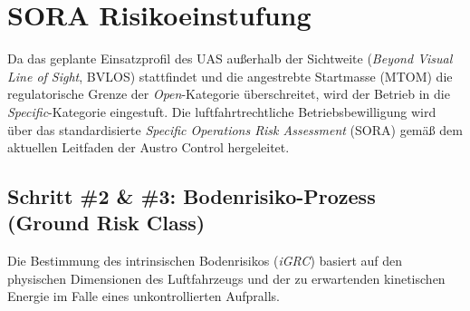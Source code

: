 \section{SORA Risikoeinstufung}
\label{sec:sora_risikoeinstufung}

Da das geplante Einsatzprofil des UAS außerhalb der Sichtweite (\textit{Beyond Visual Line of Sight}, BVLOS) stattfindet und die angestrebte Startmasse (MTOM) die regulatorische Grenze der 
\textit{Open}-Kategorie überschreitet, wird der Betrieb in die \textit{Specific}-Kategorie eingestuft. Die luftfahrtrechtliche Betriebsbewilligung wird über das standardisierte 
\textit{Specific Operations Risk Assessment} (SORA) gemäß dem aktuellen Leitfaden der Austro Control \cite{austrocontrol_sora} hergeleitet.

\subsection{Schritt \#2 \& \#3: Bodenrisiko-Prozess (Ground Risk Class)}
Die Bestimmung des intrinsischen Bodenrisikos (\textit{iGRC}) basiert auf den physischen Dimensionen des Luftfahrzeugs und der zu erwartenden kinetischen Energie im Falle eines unkontrollierten Aufpralls. 
